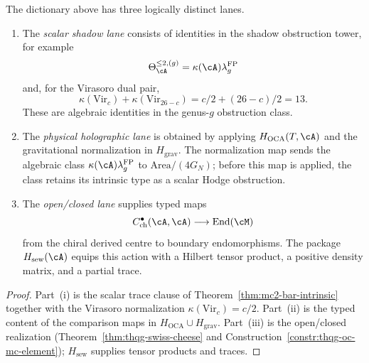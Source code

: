 \begin{proposition}
\label{prop:thqg-entanglement-lane-separation}
The dictionary above has three logically distinct lanes.
\begin{enumerate}[label=\textup{(\roman*)}]
\item The \emph{scalar shadow lane} consists of identities in the
shadow obstruction tower, for example
\[
\Theta^{\le 2,(g)}_\cA
=\kappa(\cA)\lambda_g^{\mathrm{FP}}
\]
and, for the Virasoro dual pair,
\[
\kappa(\mathrm{Vir}_c)+\kappa(\mathrm{Vir}_{26-c})
=c/2+(26-c)/2=13 .
\]
These are algebraic identities in the genus-$g$ obstruction class.

\item The \emph{physical holographic lane} is obtained by applying
$H_{\mathrm{OCA}}(T,\cA)$ and the gravitational normalization in
$H_{\mathrm{grav}}$.  The normalization map sends the algebraic class
$\kappa(\cA)\lambda_g^{\mathrm{FP}}$ to
$\mathrm{Area}/(4G_N)$; before this map is applied, the class retains
its intrinsic type as a scalar Hodge obstruction.

\item The \emph{open/closed lane} supplies typed maps
\[
C^\bullet_{\mathrm{ch}}(\cA,\cA)
\longrightarrow
\operatorname{End}(\cM)
\]
from the chiral derived centre to boundary endomorphisms.  The package
$H_{\mathrm{sew}}(\cA)$ equips this action with a Hilbert tensor
product, a positive density matrix, and a partial trace.
\end{enumerate}
\end{proposition}

\begin{proof}
Part~\textup{(i)} is the scalar trace clause of
Theorem~\ref{thm:mc2-bar-intrinsic} together with the Virasoro
normalization $\kappa(\mathrm{Vir}_c)=c/2$.  Part~\textup{(ii)} is
the typed content of the comparison maps in
$H_{\mathrm{OCA}}\cup H_{\mathrm{grav}}$.  Part~\textup{(iii)} is the
open/closed realization
(Theorem~\ref{thm:thqg-swiss-cheese} and
Construction~\ref{constr:thqg-oc-mc-element});
$H_{\mathrm{sew}}$ supplies tensor products and traces.
\end{proof}

